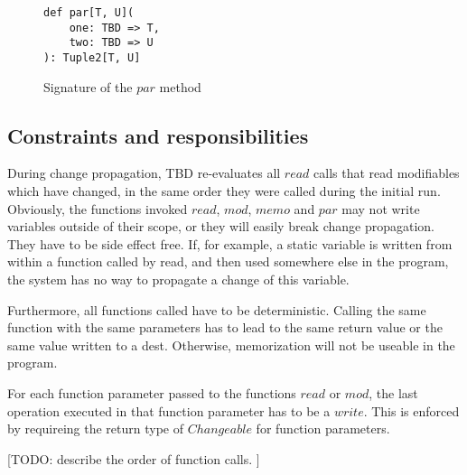 \begin{figure}
\begin{lstlisting}[frame=single,basicstyle=\ttfamily]
def par[T, U](
    one: TBD => T, 
    two: TBD => U
): Tuple2[T, U] 
\end{lstlisting}
\caption{Signature of the $par$ method}
\label{code:par}
\end{figure}

\subsection{Constraints and responsibilities}

During change propagation, TBD re-evaluates all $read$ calls that read modifiables which have changed, in the same order they were called during the initial run. Obviously, the functions invoked $read$, $mod$, $memo$ and $par$ may not write variables outside of their scope, or they will easily break change propagation. They have to be side effect free. If, for example, a static variable is written from within a function called by read, and then used somewhere else in the program, the system has no way to propagate a change of this variable.

Furthermore, all functions called have to be deterministic. Calling the same function with the same parameters has to lead to the same return value or the same value written to a dest. Otherwise, memorization will not be useable in the program.

For each function parameter passed to the functions $read$ or $mod$, the last operation executed in that function parameter has to be a $write$. This is enforced by requireing the return type of $Changeable$ for function parameters.  

[TODO: describe the order of function calls. ]